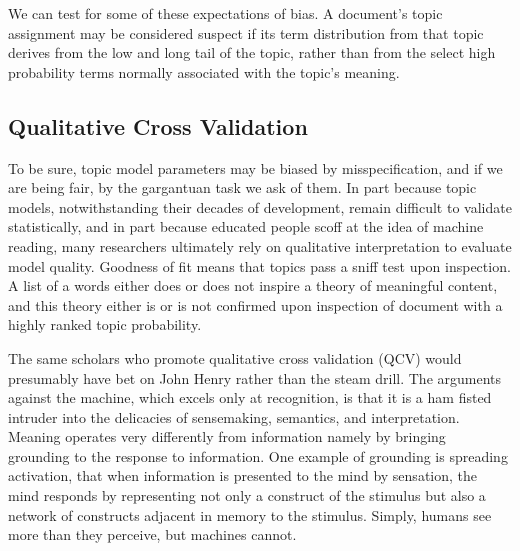 \documentclass[]{book}
\theoremstyle{definition}
\theoremstyle{definition}
\theoremstyle{definition}
\theoremstyle{remark}
\begin{document}
We can test for some of these expectations of bias. A document's topic
assignment may be considered suspect if its term distribution from that
topic derives from the low and long tail of the topic, rather than from
the select high probability terms normally associated with the topic's
meaning.

\hypertarget{qualitative-cross-validation}{%
\subsection{Qualitative Cross
Validation}\label{qualitative-cross-validation}}

To be sure, topic model parameters may be biased by misspecification,
and if we are being fair, by the gargantuan task we ask of them. In part
because topic models, notwithstanding their decades of development,
remain difficult to validate statistically, and in part because educated
people scoff at the idea of machine reading, many researchers ultimately
rely on qualitative interpretation to evaluate model quality. Goodness
of fit means that topics pass a sniff test upon inspection. A list of a
words either does or does not inspire a theory of meaningful content,
and this theory either is or is not confirmed upon inspection of
document with a highly ranked topic probability.

The same scholars who promote qualitative cross validation (QCV) would
presumably have bet on John Henry rather than the steam drill. The
arguments against the machine, which excels only at recognition, is that
it is a ham fisted intruder into the delicacies of sensemaking,
semantics, and interpretation. Meaning operates very differently from
information namely by bringing grounding to the response to information.
One example of grounding is spreading activation, that when information
is presented to the mind by sensation, the mind responds by representing
not only a construct of the stimulus but also a network of constructs
adjacent in memory to the stimulus. Simply, humans see more than they
perceive, but machines cannot.
\end{document}
